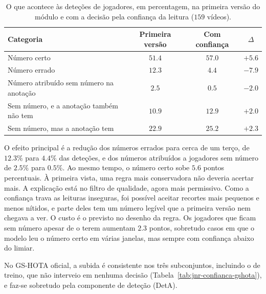 \begin{table}[htbp]
    \centering
    \caption{O que acontece às deteções de jogadores, em percentagem, na primeira versão do módulo e com a decisão pela confiança da leitura ($159$ vídeos).}
    \label{tab:jnr-categorias}
    \begin{tabular}{|l|c|c|c|}
        \hline
        \textbf{Categoria} & \textbf{Primeira versão} & \textbf{Com confiança} & \textbf{$\Delta$} \\
        \hline
        Número certo                               & $51.4$ & $57.0$ & $+5.6$ \\
        \hline
        Número errado                              & $12.3$ & $4.4$  & $-7.9$ \\
        \hline
        Número atribuído sem número na anotação    & $2.5$  & $0.5$  & $-2.0$ \\
        \hline
        Sem número, e a anotação também não tem    & $10.9$ & $12.9$ & $+2.0$ \\
        \hline
        Sem número, mas a anotação tem             & $22.9$ & $25.2$ & $+2.3$ \\
        \hline
    \end{tabular}
\end{table}

O efeito principal é a redução dos números errados para cerca de um terço, de $12.3\%$ para $4.4\%$ das deteções, e dos números atribuídos a jogadores sem número de $2.5\%$ para $0.5\%$. Ao mesmo tempo, o número certo sobe $5.6$ pontos percentuais. À primeira vista, uma regra mais conservadora não deveria acertar mais. A explicação está no filtro de qualidade, agora mais permissivo. Como a confiança trava as leituras inseguras, foi possível aceitar recortes mais pequenos e menos nítidos, e parte deles tem um número legível que a primeira versão nem chegava a ver. O custo é o previsto no desenho da regra. Os jogadores que ficam sem número apesar de o terem aumentam $2.3$ pontos, sobretudo casos em que o modelo leu o número certo em várias janelas, mas sempre com confiança abaixo do limiar.

No GS-HOTA oficial, a subida é consistente nos três subconjuntos, incluindo o de treino, que não interveio em nenhuma decisão (Tabela~\ref{tab:jnr-confianca-gshota}), e faz-se sobretudo pela componente de deteção (DetA).

